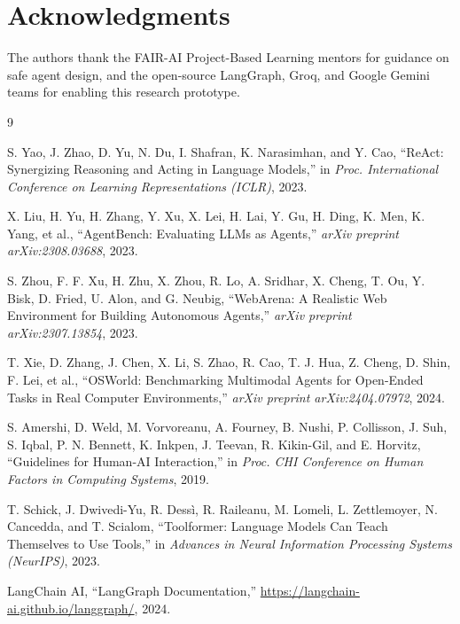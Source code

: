 \documentclass[11pt,a4paper]{article}
\begin{document}
\section*{Acknowledgments}

The authors thank the FAIR-AI Project-Based Learning mentors for guidance on safe agent design, and the open-source LangGraph, Groq, and Google Gemini teams for enabling this research prototype.

\begin{thebibliography}{9}

S. Yao, J. Zhao, D. Yu, N. Du, I. Shafran, K. Narasimhan, and Y. Cao, ``ReAct: Synergizing Reasoning and Acting in Language Models,'' in \textit{Proc. International Conference on Learning Representations (ICLR)}, 2023.

X. Liu, H. Yu, H. Zhang, Y. Xu, X. Lei, H. Lai, Y. Gu, H. Ding, K. Men, K. Yang, et al., ``AgentBench: Evaluating LLMs as Agents,'' \textit{arXiv preprint arXiv:2308.03688}, 2023.

S. Zhou, F. F. Xu, H. Zhu, X. Zhou, R. Lo, A. Sridhar, X. Cheng, T. Ou, Y. Bisk, D. Fried, U. Alon, and G. Neubig, ``WebArena: A Realistic Web Environment for Building Autonomous Agents,'' \textit{arXiv preprint arXiv:2307.13854}, 2023.

T. Xie, D. Zhang, J. Chen, X. Li, S. Zhao, R. Cao, T. J. Hua, Z. Cheng, D. Shin, F. Lei, et al., ``OSWorld: Benchmarking Multimodal Agents for Open-Ended Tasks in Real Computer Environments,'' \textit{arXiv preprint arXiv:2404.07972}, 2024.

S. Amershi, D. Weld, M. Vorvoreanu, A. Fourney, B. Nushi, P. Collisson, J. Suh, S. Iqbal, P. N. Bennett, K. Inkpen, J. Teevan, R. Kikin-Gil, and E. Horvitz, ``Guidelines for Human-AI Interaction,'' in \textit{Proc. CHI Conference on Human Factors in Computing Systems}, 2019.

T. Schick, J. Dwivedi-Yu, R. Dessì, R. Raileanu, M. Lomeli, L. Zettlemoyer, N. Cancedda, and T. Scialom, ``Toolformer: Language Models Can Teach Themselves to Use Tools,'' in \textit{Advances in Neural Information Processing Systems (NeurIPS)}, 2023.

LangChain AI, ``LangGraph Documentation,'' \url{https://langchain-ai.github.io/langgraph/}, 2024.

\end{thebibliography}
\end{document}
